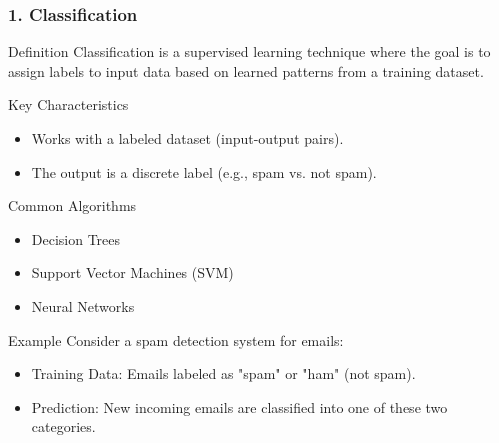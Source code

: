 \documentclass[aspectratio=169]{beamer}
\begin{document}
\begin{frame}[fragile]
    \frametitle{1. Classification}
    \begin{block}{Definition}
        Classification is a supervised learning technique where the goal is to assign labels to input data based on learned patterns from a training dataset.
    \end{block}

    \begin{block}{Key Characteristics}
        \begin{itemize}
            \item Works with a labeled dataset (input-output pairs).
            \item The output is a discrete label (e.g., spam vs. not spam).
        \end{itemize}
    \end{block}

    \begin{block}{Common Algorithms}
        \begin{itemize}
            \item Decision Trees
            \item Support Vector Machines (SVM)
            \item Neural Networks
        \end{itemize}
    \end{block}

    \begin{block}{Example}
        Consider a spam detection system for emails:
        \begin{itemize}
            \item Training Data: Emails labeled as "spam" or "ham" (not spam).
            \item Prediction: New incoming emails are classified into one of these two categories.
        \end{itemize}
    \end{block}
\end{frame}
\end{document}
